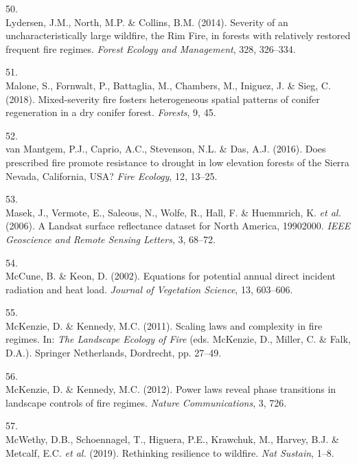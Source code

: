\documentclass[]{article}
\begin{document}
\leavevmode\hypertarget{ref-lydersen2014}{}%
50.\\
Lydersen, J.M., North, M.P. \& Collins, B.M. (2014). Severity of an
uncharacteristically large wildfire, the Rim Fire, in forests with
relatively restored frequent fire regimes. \emph{Forest Ecology and
Management}, 328, 326--334.

\leavevmode\hypertarget{ref-malone2018}{}%
51.\\
Malone, S., Fornwalt, P., Battaglia, M., Chambers, M., Iniguez, J. \&
Sieg, C. (2018). Mixed-severity fire fosters heterogeneous spatial
patterns of conifer regeneration in a dry conifer forest.
\emph{Forests}, 9, 45.

\leavevmode\hypertarget{ref-vanmantgem2016}{}%
52.\\
van Mantgem, P.J., Caprio, A.C., Stevenson, N.L. \& Das, A.J. (2016).
Does prescribed fire promote resistance to drought in low elevation
forests of the Sierra Nevada, California, USA? \emph{Fire Ecology}, 12,
13--25.

\leavevmode\hypertarget{ref-masek2006}{}%
53.\\
Masek, J., Vermote, E., Saleous, N., Wolfe, R., Hall, F. \& Huemmrich,
K. \emph{et al.} (2006). A Landsat surface reflectance dataset for North
America, 19902000. \emph{IEEE Geoscience and Remote Sensing Letters}, 3,
68--72.

\leavevmode\hypertarget{ref-mccune2002}{}%
54.\\
McCune, B. \& Keon, D. (2002). Equations for potential annual direct
incident radiation and heat load. \emph{Journal of Vegetation Science},
13, 603--606.

\leavevmode\hypertarget{ref-mckenzie2011}{}%
55.\\
McKenzie, D. \& Kennedy, M.C. (2011). Scaling laws and complexity in
fire regimes. In: \emph{The Landscape Ecology of Fire} (eds. McKenzie,
D., Miller, C. \& Falk, D.A.). Springer Netherlands, Dordrecht, pp.
27--49.

\leavevmode\hypertarget{ref-mckenzie2012}{}%
56.\\
McKenzie, D. \& Kennedy, M.C. (2012). Power laws reveal phase
transitions in landscape controls of fire regimes. \emph{Nature
Communications}, 3, 726.

\leavevmode\hypertarget{ref-mcwethy2019}{}%
57.\\
McWethy, D.B., Schoennagel, T., Higuera, P.E., Krawchuk, M., Harvey,
B.J. \& Metcalf, E.C. \emph{et al.} (2019). Rethinking resilience to
wildfire. \emph{Nat Sustain}, 1--8.
\end{document}
